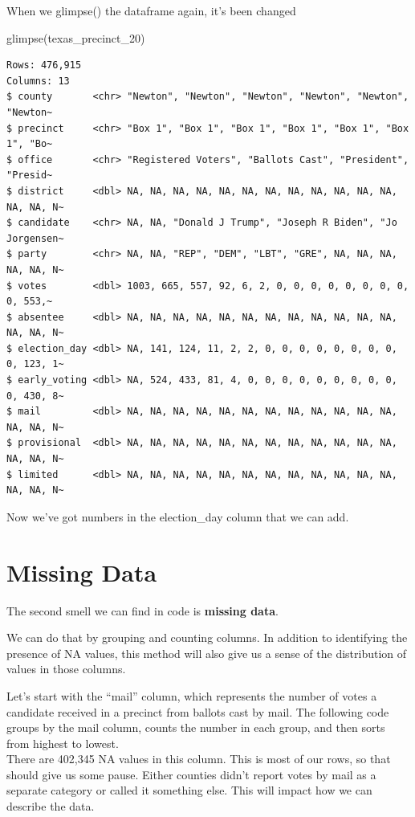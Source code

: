\documentclass[
  letterpaper,
  DIV=11,
  numbers=noendperiod]{scrreprt}
\newenvironment{Shaded}{\begin{snugshade}}{\end{snugshade}}
\newcommand{\FunctionTok}[1]{\textcolor[rgb]{0.28,0.35,0.67}{#1}}
\newcommand{\NormalTok}[1]{\textcolor[rgb]{0.00,0.23,0.31}{#1}}
\begin{document}
When we glimpse() the dataframe again, it's been changed

\begin{Shaded}
\begin{Highlighting}[]
\FunctionTok{glimpse}\NormalTok{(texas\_precinct\_20)}
\end{Highlighting}
\end{Shaded}

\begin{verbatim}
Rows: 476,915
Columns: 13
$ county       <chr> "Newton", "Newton", "Newton", "Newton", "Newton", "Newton~
$ precinct     <chr> "Box 1", "Box 1", "Box 1", "Box 1", "Box 1", "Box 1", "Bo~
$ office       <chr> "Registered Voters", "Ballots Cast", "President", "Presid~
$ district     <dbl> NA, NA, NA, NA, NA, NA, NA, NA, NA, NA, NA, NA, NA, NA, N~
$ candidate    <chr> NA, NA, "Donald J Trump", "Joseph R Biden", "Jo Jorgensen~
$ party        <chr> NA, NA, "REP", "DEM", "LBT", "GRE", NA, NA, NA, NA, NA, N~
$ votes        <dbl> 1003, 665, 557, 92, 6, 2, 0, 0, 0, 0, 0, 0, 0, 0, 0, 553,~
$ absentee     <dbl> NA, NA, NA, NA, NA, NA, NA, NA, NA, NA, NA, NA, NA, NA, N~
$ election_day <dbl> NA, 141, 124, 11, 2, 2, 0, 0, 0, 0, 0, 0, 0, 0, 0, 123, 1~
$ early_voting <dbl> NA, 524, 433, 81, 4, 0, 0, 0, 0, 0, 0, 0, 0, 0, 0, 430, 8~
$ mail         <dbl> NA, NA, NA, NA, NA, NA, NA, NA, NA, NA, NA, NA, NA, NA, N~
$ provisional  <dbl> NA, NA, NA, NA, NA, NA, NA, NA, NA, NA, NA, NA, NA, NA, N~
$ limited      <dbl> NA, NA, NA, NA, NA, NA, NA, NA, NA, NA, NA, NA, NA, NA, N~
\end{verbatim}

Now we've got numbers in the election\_day column that we can add.

\hypertarget{missing-data}{%
\section{Missing Data}\label{missing-data}}

The second smell we can find in code is \textbf{missing data}.

We can do that by grouping and counting columns. In addition to
identifying the presence of NA values, this method will also give us a
sense of the distribution of values in those columns.

Let's start with the ``mail'' column, which represents the number of
votes a candidate received in a precinct from ballots cast by mail. The
following code groups by the mail column, counts the number in each
group, and then sorts from highest to lowest.\\
There are 402,345 NA values in this column. This is most of our rows, so
that should give us some pause. Either counties didn't report votes by
mail as a separate category or called it something else. This will
impact how we can describe the data.
\end{document}
